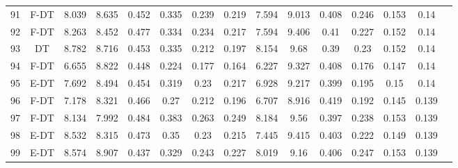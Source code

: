 \begin{longtable}{@{\hskip3pt}c@{\hskip3pt}c@{\hskip3pt}c@{\hskip3pt}c@{\hskip3pt}c@{\hskip3pt}c@{\hskip3pt}c@{\hskip3pt}c@{\hskip3pt}c@{\hskip3pt}c@{\hskip3pt}c@{\hskip3pt}c@{\hskip3pt}c@{\hskip3pt}c@{\hskip3pt}c}
         91 &           F-DT &             8.039 &          8.635 &           0.452 &           0.335 &           0.239 &           0.219 &               7.594 &           9.013 &           0.408 &         0.246 &          0.153 &            0.14 \\
         92 &           F-DT &             8.263 &          8.452 &           0.477 &           0.334 &           0.234 &           0.217 &               7.594 &           9.406 &            0.41 &         0.227 &          0.152 &            0.14 \\
         93 &             DT &             8.782 &          8.716 &           0.453 &           0.335 &           0.212 &           0.197 &               8.154 &            9.68 &            0.39 &          0.23 &          0.152 &            0.14 \\
         94 &           F-DT &             6.655 &          8.822 &           0.448 &           0.224 &           0.177 &           0.164 &               6.227 &           9.327 &           0.408 &         0.176 &          0.147 &            0.14 \\
         95 &           E-DT &             7.692 &          8.494 &           0.454 &           0.319 &            0.23 &           0.217 &               6.928 &           9.217 &           0.399 &         0.195 &           0.15 &            0.14 \\
         96 &           F-DT &             7.178 &          8.321 &           0.466 &            0.27 &           0.212 &           0.196 &               6.707 &           8.916 &           0.419 &         0.192 &          0.145 &           0.139 \\
         97 &           F-DT &             8.134 &          7.992 &           0.484 &           0.383 &           0.263 &           0.249 &               8.184 &            9.56 &           0.397 &         0.238 &          0.153 &           0.139 \\
         98 &           E-DT &             8.532 &          8.315 &           0.473 &            0.35 &            0.23 &           0.215 &               7.445 &           9.415 &           0.403 &         0.222 &          0.149 &           0.139 \\
         99 &           E-DT &             8.574 &          8.907 &           0.437 &           0.329 &           0.243 &           0.227 &               8.019 &            9.16 &           0.406 &         0.247 &          0.153 &           0.139 \\

\end{longtable}
